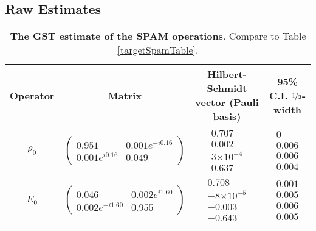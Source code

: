 \documentclass{article}[11pt]
\providecommand{\e}[1]{\ensuremath{\times 10^{#1}}}
\begin{document}
\FloatBarrier

\subsection{Raw Estimates}

\begin{table}[h]
\begin{center}
\begin{tabular}[l]{|c|c|c|c|}
\hline
Operator & Matrix & Hilbert-Schmidt vector (Pauli basis) & 95\% C.I. $\nicefrac{1}{2}$-width \\ \hline
$\rho_{0}$ & $ \left(\!\!\begin{array}{cc}
0.951 & 0.001e^{-i0.16} \\ 
0.001e^{i0.16} & 0.049
 \end{array}\!\!\right) $
 & $ \begin{array}{c}
0.707 \\ 
0.002 \\ 
3\e{-4} \\ 
0.637
 \end{array} $
 & $ \begin{array}{c}
0 \\ 
0.006 \\ 
0.006 \\ 
0.004
 \end{array} $
 \\ \hline
$E_{0}$ & $ \left(\!\!\begin{array}{cc}
0.046 & 0.002e^{i1.60} \\ 
0.002e^{-i1.60} & 0.955
 \end{array}\!\!\right) $
 & $ \begin{array}{c}
0.708 \\ 
-8\e{-5} \\ 
-0.003 \\ 
-0.643
 \end{array} $
 & $ \begin{array}{c}
0.001 \\ 
0.005 \\ 
0.006 \\ 
0.005
 \end{array} $
 \\ \hline
\end{tabular}

\caption{\textbf{The GST estimate of the SPAM operations}.  Compare to Table \ref{targetSpamTable}.\label{bestGatesetSpamTable}}
\end{center}
\end{table}
\end{document}
